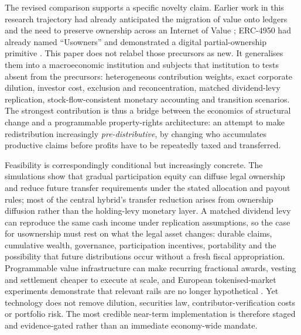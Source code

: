 The revised comparison supports a specific novelty claim. Earlier work in this research trajectory had already anticipated the migration of value onto ledgers and the need to preserve ownership across an Internet of Value \citep{delarosa2022iov}; ERC-4950 had already named ``Usowners'' and demonstrated a digital partial-ownership primitive \citep{erc4950}. This paper does not relabel those precursors as new. It generalises them into a macroeconomic institution and subjects that institution to tests absent from the precursors: heterogeneous contribution weights, exact corporate dilution, investor cost, exclusion and reconcentration, matched dividend-levy replication, stock-flow-consistent monetary accounting and transition scenarios. The strongest contribution is thus a bridge between the economics of structural change and a programmable property-rights architecture: an attempt to make redistribution increasingly \emph{pre-distributive}, by changing who accumulates productive claims before profits have to be repeatedly taxed and transferred.

Feasibility is correspondingly conditional but increasingly concrete. The simulations show that gradual participation equity can diffuse legal ownership and reduce future transfer requirements under the stated allocation and payout rules; most of the central hybrid's transfer reduction arises from ownership diffusion rather than the holding-levy monetary layer. A matched dividend levy can reproduce the same cash income under replication assumptions, so the case for usownership must rest on what the legal asset changes: durable claims, cumulative wealth, governance, participation incentives, portability and the possibility that future distributions occur without a fresh fiscal appropriation. Programmable value infrastructure can make recurring fractional awards, vesting and settlement cheaper to execute at scale, and European tokenised-market experiments demonstrate that relevant rails are no longer hypothetical \citep{cipollone2026,eciov2026,bis2026}. Yet technology does not remove dilution, securities law, contributor-verification costs or portfolio risk. The most credible near-term implementation is therefore staged and evidence-gated rather than an immediate economy-wide mandate.

